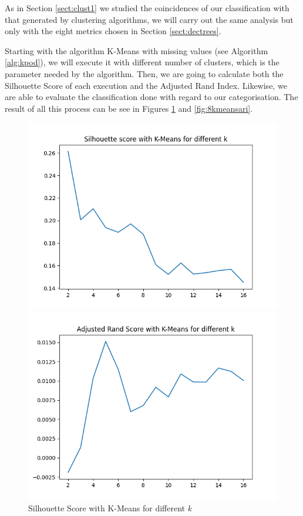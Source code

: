 As in Section \ref{sect:clust1} we studied the coincidences of our classification with that generated by clustering algorithms, we will carry out the same analysis but only with the eight metrics chosen in Section \ref{sect:dectrees}.

Starting with the algorithm K-Means with missing values (see Algorithm \ref{alg:kpod}), we will execute it with different number of clusters, which is the parameter needed by the algorithm. Then, we are going to calculate both the Silhouette Score of each execution and the Adjusted Rand Index. Likewise, we are able to evaluate the classification done with regard to our categorisation. The result of all this process can be see in Figures \ref{fig:8kmeanssil} and \ref{fig:8kmeansari}.

\begin{figure}
	\hspace{-1cm}\begin{minipage}[b]{0.4\paperwidth}
		\centerline{\includegraphics[width=\textwidth]{Imagenes/Bitmap/Clustering/kmeans8sil.png}}%
		\caption{Silhouette Score with K-Means for different $k$}%
		\label{fig:8kmeanssil}
	\end{minipage}
	\hspace{0.4cm}
	\begin{minipage}[b]{0.4\paperwidth}
		\centerline{\includegraphics[width=\textwidth]{Imagenes/Bitmap/Clustering/kmeans8ari.png}}%

\end{minipage}
\end{figure}
